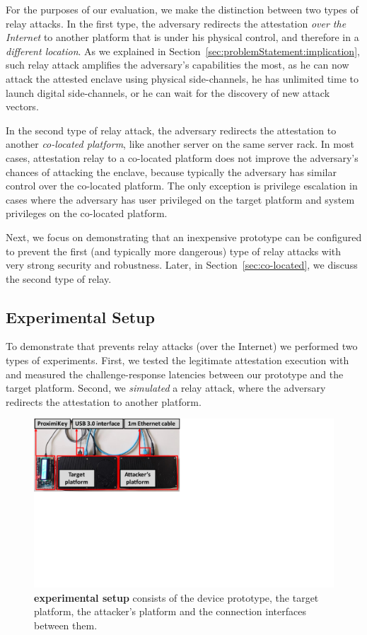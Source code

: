 For the purposes of our evaluation, we make the distinction between two types of relay attacks. In the first type, the adversary redirects the attestation \emph{over the Internet} to another platform that is under his physical control, and therefore in a \emph{different location}. As we explained in Section~\ref{sec:problemStatement:implication}, such relay attack amplifies the adversary's capabilities the most, as he can now attack the attested enclave using physical side-channels, he has unlimited time to launch digital side-channels, or he can wait for the discovery of new attack vectors. 
 
In the second type of relay attack, the adversary redirects the attestation to another \emph{co-located platform}, like another server on the same server rack. In most cases, attestation relay to a co-located platform does not improve the adversary's chances of attacking the enclave, because typically the adversary has similar control over the co-located platform. The only exception is privilege escalation in cases where the adversary has user privileged on the target platform and system privileges on the co-located platform. 

Next, we focus on demonstrating that an inexpensive \name prototype can be configured to prevent the first (and typically more dangerous) type of relay attacks with very strong security and robustness. Later, in Section~\ref{sec:co-located}, we discuss the second type of relay.


\subsection{Experimental Setup}
\label{sec:evaluation:exp}

To demonstrate that \name prevents relay attacks (over the Internet) we performed two types of experiments. First, we tested the legitimate attestation execution with \name and measured the challenge-response latencies between our prototype and the target platform. Second, we \emph{simulated} a relay attack, where the adversary redirects the attestation to another platform.

\begin{figure}[t]
  \centering
    \includegraphics[trim={0 11cm 17cm 0}, clip, width=0.6\linewidth]{chapters/ProximiTEE/figures/Setup2.pdf}
    \caption[\name experimental setup]{\textbf{\name experimental setup} consists of the \device device prototype, the target platform, the attacker's platform and the connection interfaces between them.}

    \label{fig:setup}
\end{figure}

